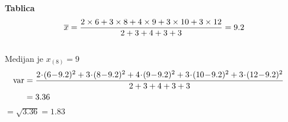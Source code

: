\documentclass{article}%
\begin{document}
%
\normalsize%
\renewcommand{\arraystretch}{1.5}%
\textbf{\huge Tablica\\}%
%
\Large \[ \overline{x} = \frac{%
2 \times 6 + 3 \times 8 + 4 \times 9 + 3 \times 10 + 3 \times 12%
}{%
2 + 3 + 4 + 3 + 3%
} = 9.2\] \\%
Medijan je $x_{(8)}=9$ \\%
\begin{align*}%
\hspace*{-\leftmargin} %
\text{var} &= \frac{%
2\! \cdot \!(6\!-\!9.2)^2 + 3\! \cdot \!(8\!-\!9.2)^2 + 4\! \cdot \!(9\!-\!9.2)^2 + 3\! \cdot \!(10\!-\!9.2)^2 + 3\! \cdot \!(12\!-\!9.2)^2%
}{%
2 + 3 + 4 + 3 + 3%
}%
\\%
&= 3.36%
\end{align*}%
 $= \sqrt{3.36} = 1.83$ \\%
\end{document}
